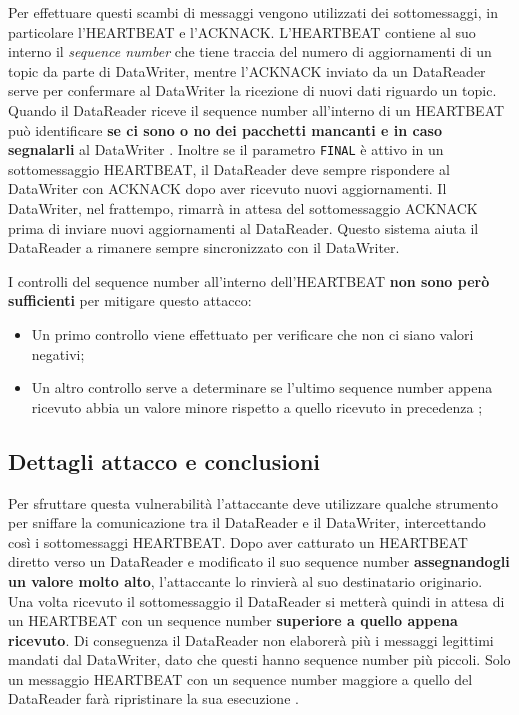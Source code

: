 Per effettuare questi scambi di messaggi vengono utilizzati dei sottomessaggi,
in particolare l'HEARTBEAT e l'ACKNACK.
L'HEARTBEAT contiene al suo interno il \textit{sequence number} che tiene traccia 
del numero di aggiornamenti di un topic da parte di DataWriter, mentre
l'ACKNACK inviato da un DataReader
serve per confermare al DataWriter la ricezione di nuovi dati 
riguardo un topic.
Quando il DataReader riceve il sequence number all'interno di un HEARTBEAT
può identificare 
\textbf{se ci sono o no dei pacchetti mancanti e in caso segnalarli} al
DataWriter \cite{White2017AnII}.
Inoltre se il parametro \texttt{FINAL} è attivo in un sottomessaggio HEARTBEAT, il DataReader 
deve sempre rispondere al DataWriter con ACKNACK dopo aver ricevuto nuovi aggiornamenti.
Il DataWriter, nel frattempo, rimarrà in attesa del sottomessaggio 
ACKNACK prima di 
inviare nuovi aggiornamenti al DataReader.
Questo sistema aiuta il DataReader a rimanere sempre sincronizzato con il 
DataWriter.

I controlli del sequence number all'interno dell'HEARTBEAT 
\textbf{non sono però sufficienti} per mitigare questo attacco:
\begin{itemize}
    \item Un primo controllo viene effettuato per verificare che non ci siano 
    valori negativi;
    \item Un altro controllo serve a determinare se l'ultimo sequence number
    appena ricevuto abbia
    un valore minore rispetto a quello ricevuto in precedenza
    \cite{White2017AnII};
\end{itemize}


\subsection{Dettagli attacco e conclusioni}

Per sfruttare questa vulnerabilità l'attaccante deve utilizzare qualche 
strumento per sniffare la comunicazione tra il DataReader e il DataWriter,
intercettando così i
sottomessaggi HEARTBEAT. Dopo aver catturato un HEARTBEAT diretto verso 
un DataReader e modificato 
il suo sequence number \textbf{assegnandogli un valore molto alto}, 
l'attaccante lo rinvierà al suo destinatario originario.
Una volta ricevuto il sottomessaggio il DataReader si metterà quindi 
in attesa di un HEARTBEAT con un sequence number 
\textbf{superiore a quello appena ricevuto}. Di conseguenza il DataReader
non elaborerà più i messaggi legittimi mandati dal DataWriter,
dato che questi hanno sequence number più piccoli.
Solo un messaggio HEARTBEAT con un sequence number
maggiore a quello del DataReader farà ripristinare la sua esecuzione 
\cite{White2017AnII}.


